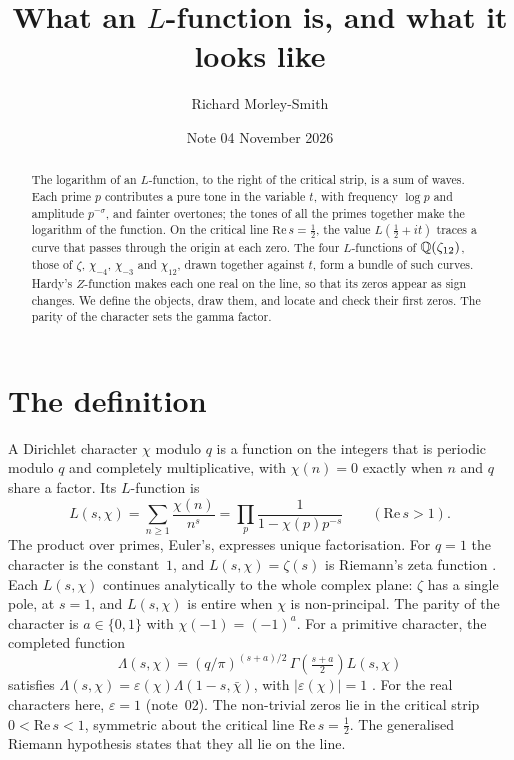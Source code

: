 \documentclass[11pt]{article}
\title{What an $L$-function is, and what it looks like}
\author{Richard Morley-Smith}
\date{Note 04 \quad November 2026}
\begin{document}
\maketitle

\begin{abstract}
\noindent
The logarithm of an $L$-function, to the right of the critical strip, is a sum of waves.
Each prime $p$ contributes a pure tone in the variable $t$, with frequency $\log p$ and amplitude $p^{-\sigma}$, and fainter overtones; the tones of all the primes together make the logarithm of the function.
On the critical line $\mathrm{Re}\,s = \frac12$, the value $L(\tfrac12+it)$ traces a curve that passes through the origin at each zero.
The four $L$-functions of $\mathbb{Q}(\zeta_{12})$, those of $\zeta$, $\chi_{-4}$, $\chi_{-3}$ and $\chi_{12}$, drawn together against $t$, form a bundle of such curves.
Hardy's $Z$-function makes each one real on the line, so that its zeros appear as sign changes.
We define the objects, draw them, and locate and check their first zeros.
The parity of the character sets the gamma factor.
\end{abstract}

\section{The definition}

A Dirichlet character $\chi$ modulo $q$ is a function on the integers that is periodic modulo $q$ and completely multiplicative, with $\chi(n)=0$ exactly when $n$ and $q$ share a factor.
Its $L$-function is
\[
  L(s,\chi) = \sum_{n\ge1}\frac{\chi(n)}{n^s} = \prod_p \frac{1}{1-\chi(p)p^{-s}}\qquad(\mathrm{Re}\,s>1).
\]
The product over primes, Euler's, expresses unique factorisation.
For $q=1$ the character is the constant~$1$, and $L(s,\chi) = \zeta(s)$ is Riemann's zeta function \cite{Edwards}.
Each $L(s,\chi)$ continues analytically to the whole complex plane: $\zeta$ has a single pole, at $s=1$, and $L(s,\chi)$ is entire when $\chi$ is non-principal.
The parity of the character is $a\in\{0,1\}$ with $\chi(-1) = (-1)^a$.
For a primitive character, the completed function
\[
  \Lambda(s,\chi) = (q/\pi)^{(s+a)/2}\,\Gamma\!\left(\tfrac{s+a}{2}\right)L(s,\chi)
\]
satisfies $\Lambda(s,\chi) = \varepsilon(\chi)\Lambda(1-s,\bar\chi)$, with $|\varepsilon(\chi)| = 1$ \cite{Davenport}.
For the real characters here, $\varepsilon = 1$ (note~02).
The non-trivial zeros lie in the critical strip $0<\mathrm{Re}\,s<1$, symmetric about the critical line $\mathrm{Re}\,s=\frac12$.
The generalised Riemann hypothesis states that they all lie on the line.
\end{document}

